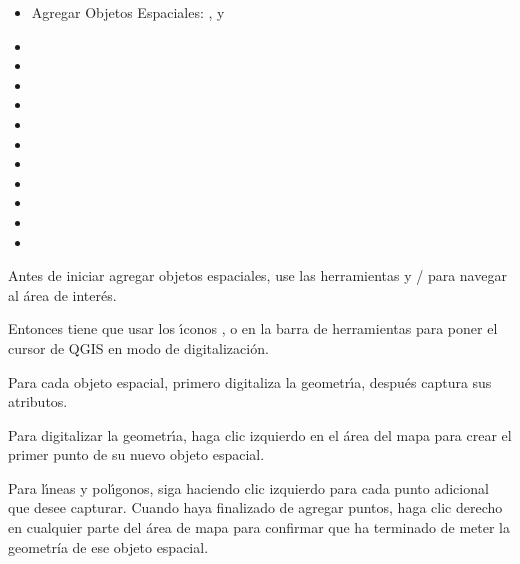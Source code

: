 \begin{itemize}
\item Agregar Objetos Espaciales: ,
   y
\item {}
\item {}
\item {}
\item {}
\item {}
\item {}
\item {}
\item {}
\item {}
\item {}
\item {}
\end{itemize}


Antes de iniciar agregar objetos espaciales, use las herramientas 
y / 
para navegar al \'area de inter\'es.

Entonces tiene que usar los \'{\i}conos ,
 o
 en la barra de herramientas para poner el cursor de QGIS
en modo de digitalizaci\'on.

Para cada objeto espacial, primero digitaliza la geometr\'{\i}a, después captura sus atributos.

Para digitalizar la geometr\'{\i}a, haga clic izquierdo en el \'area del mapa para crear el primer
punto de su nuevo objeto espacial.

Para l\'{\i}neas y pol\'{\i}gonos, siga haciendo clic izquierdo para cada punto adicional
que desee capturar. Cuando haya finalizado de agregar puntos,
haga clic derecho en cualquier parte del \'area de mapa para confirmar que ha terminado de meter
la geometr\'{i}a de ese objeto espacial.

